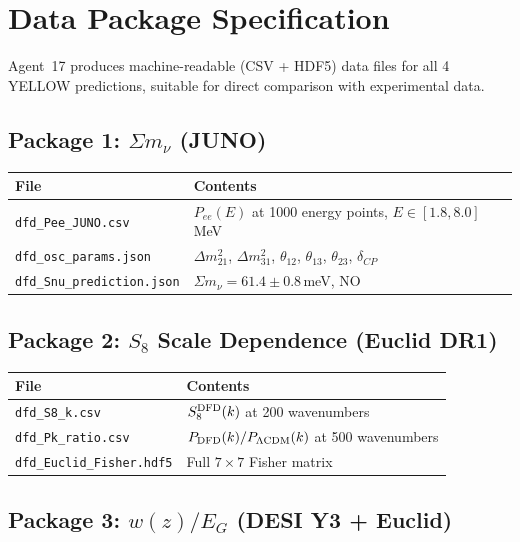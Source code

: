 \documentclass[11pt,a4paper]{article}
\begin{document}
\section{Data Package Specification}

Agent~17 produces machine-readable (CSV + HDF5) data files for all 4 YELLOW predictions, suitable for direct comparison with experimental data.

\subsection{Package 1: $\Sigma m_\nu$ (JUNO)}

\begin{center}
\begin{tabular}{ll}
\toprule
\textbf{File} & \textbf{Contents} \\
\midrule
\texttt{dfd\_Pee\_JUNO.csv} & $P_{ee}(E)$ at 1000 energy points, $E \in [1.8, 8.0]$\,MeV \\
\texttt{dfd\_osc\_params.json} & $\Delta m^2_{21}$, $\Delta m^2_{31}$, $\theta_{12}$, $\theta_{13}$, $\theta_{23}$, $\delta_{CP}$ \\
\texttt{dfd\_Snu\_prediction.json} & $\Sigma m_\nu = 61.4 \pm 0.8$\,meV, NO \\
\bottomrule
\end{tabular}
\end{center}

\subsection{Package 2: $S_8$ Scale Dependence (Euclid DR1)}

\begin{center}
\begin{tabular}{ll}
\toprule
\textbf{File} & \textbf{Contents} \\
\midrule
\texttt{dfd\_S8\_k.csv} & $S_8^{\rm DFD}(k)$ at 200 wavenumbers \\
\texttt{dfd\_Pk\_ratio.csv} & $P_{\rm DFD}(k)/P_{\Lambda\rm CDM}(k)$ at 500 wavenumbers \\
\texttt{dfd\_Euclid\_Fisher.hdf5} & Full $7\times 7$ Fisher matrix \\
\bottomrule
\end{tabular}
\end{center}

\subsection{Package 3: $w(z)/E_G$ (DESI Y3 + Euclid)}
\end{document}
